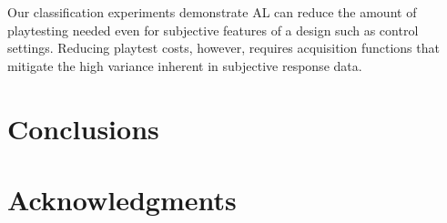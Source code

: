 \documentclass{sig-alternate}
\begin{document}
Our classification experiments demonstrate AL can reduce the amount of playtesting needed even for subjective features of a design such as control settings.
Reducing playtest costs, however, requires acquisition functions that mitigate the high variance inherent in subjective response data.







\section{Conclusions}









\section{Acknowledgments}



\end{document}
